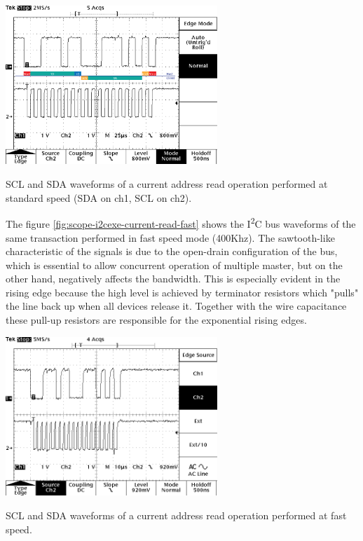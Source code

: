 \documentclass[a4paper,10pt]{article}
\makeatletter
\newenvironment{figurehere}{\def\@captype{figure}\vspace{2ex}}{\vspace{2ex}}
\newcommand{\iic}{I\textsuperscript{2}C }
\makeatother
\begin{document}
\begin{multicols}{2}
\begin{figurehere}
 \centering
 \includegraphics[width=8cm]{./figures/scope-i2cexe-current-read-std.png}
 \caption{SCL and SDA waveforms of a current address read operation performed
	at standard speed (SDA on ch1, SCL on ch2).}
 \label{fig:scope-i2cexe-current-read-std}
\end{figurehere}

The figure \ref{fig:scope-i2cexe-current-read-fast} shows the \iic bus waveforms
of the same transaction performed in fast speed mode (400Khz).
The sawtooth-like characteristic of the signals is due to the open-drain
configuration of the bus, which is essential to allow concurrent operation of
multiple master, but on the other hand, negatively affects the bandwidth.
This is especially evident in the rising edge because the high level is
achieved by terminator resistors which "pulls" the line back up when all
devices release it.
Together with the wire capacitance these pull-up resistors are responsible for
the exponential rising edges.

\begin{figurehere}
 \centering
 \includegraphics[width=8cm]{./figures/scope-i2cexe-current-read-fast.png}
 \caption{SCL and SDA waveforms of a current address read operation performed at
	fast speed.}
 \label{fig:scope-i2cexe-current-read-fast}
\end{figurehere}


\end{multicols}
\end{document}
